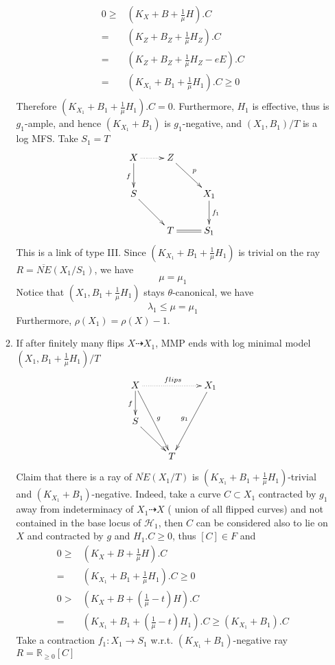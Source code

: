 \documentclass{article}
\begin{document}
\begin{enumerate}[step 1]
\begin{enumerate}[1)]
\begin{equation*}
\begin{aligned}
0\geqslant& (K_X+B+\frac{1}{\mu}H).C\\
=&(K_Z+B_Z+\frac{1}{\mu}H_Z).C\\
=&(K_Z+B_Z+\frac{1}{\mu}H_Z-eE).C\\
=&(K_{X_1}+B_1+\frac{1}{\mu}H_1).C\geqslant 0\\
\end{aligned}
\end{equation*}
Therefore $ (K_{X_1}+B_1+\frac{1}{\mu}H_1).C=0 $. Furthermore, $ H_1 $ is effective, thus is $ g_1 $-ample, and hence $ (K_{X_1}+B_1) $ is $ g_1 $-negative, and $ (X_1,B_1)/T $ is a log MFS. Take $ S_1=T $
$$ \xymatrix{
X\ar[d]_f\ar@{.>}[r]&Z\ar[rd]^{p}&\\
S\ar[dr]&&X_1\ar[d]^{f_1}\\
&T&S_1\ar@{=}[l]}$$
This is a link of type III. Since $ (K_{X_1}+B_1+\frac{1}{\mu}H_1) $ is trivial on the ray $ R=\overline{NE}(X_1/S_1) $, we  have 
$$ \mu=\mu_1 $$
Notice that $ (X_1,B_1+\frac{1}{\mu}H_1) $ stays $ \theta $-canonical, we have
$$ \lambda_1\leqslant \mu=\mu_1 $$
Furthermore, $ \rho(X_1)=\rho(X)-1 $.
\item If after finitely many flips $ X\dashrightarrow X_1 $, MMP ends with log minimal model $ (X_1,B_1+\frac{1}{\mu}H_1)/T $
$$ \xymatrix{
X\ar[d]_f\ar[ddr]^g\ar@{.>}[rr]^{flips}&&X_1\ar[ddl]_{g_1}\\
S\ar[dr]&&\\
&T &}$$
Claim that there is a ray of $ \overline{NE}(X_1/T) $ is $ (K_{X_1}+B_1+\frac{1}{\mu}H_1) $-trivial and $ (K_{X_1}+B_1) $-negative. Indeed, take a curve $ C\subset X_1 $ contracted by $ g_1 $ away from indeterminacy of $ X_1\dashrightarrow X $ ( union of all flipped curves) and not contained in the base locus of $ \mathcal{H}_1 $, then $ C $ can be considered also to lie on $ X $ and contracted by $ g $ and $ H_1.C\geqslant 0 $, thus $ [C]\in F $ and
\begin{equation*}
\begin{aligned}
0\geqslant& (K_X+B+\frac{1}{\mu}H).C\\
=&(K_{X_1}+B_1+\frac{1}{\mu}H_1).C\geqslant 0\\
0> &(K_X+B+(\frac{1}{\mu}-t)H).C\\
=&(K_{X_1}+B_1+(\frac{1}{\mu}-t)H_1).C\geqslant (K_{X_1}+B_1).C
\end{aligned}
\end{equation*}
Take a contraction $ f_1:X_1\to S_1 $ w.r.t. $ (K_{X_1}+B_1) $-negative ray $ R=\mathbb{R}_{\geqslant 0}[C] $

\end{enumerate}
\end{enumerate}
\end{document}
